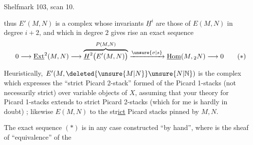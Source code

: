 Shelfmark 103, scan 10.


thus $E'(M,N)$ is a complex whose invariants $\underline{H}^{i}$ are those of $E(M,N)$ in degree $i+2$, and which in degree $2$ gives rise  an exact sequence
\[
0\longrightarrow\underline{\mathrm{Ext}}^{2}(M,N)\longrightarrow
\overbrace{\underline{H}^{2}\bigl(E'(M,N)\bigr)}^{P(M,N)}
\xrightarrow{\unsure{\sigma|s}}\underline{\mathrm{Hom}}(M,{}_{2}N)\longrightarrow 0
\tag*{\makebox[0pt][r]{\makebox[\displaywidth][l]{$(*)$}}}
\]

Heuristically, $E'(M,\deleted{\unsure{M|N}}\unsure{N|\mathbb{N}})$ is the complex which expresses the ``strict Picard 2-stack'' formed of the Picard 1-stacks (not necessarily strict)  over variable objects of $X$, assuming that your theory for  Picard 1-stacks extends to strict Picard 2-stacks (which for me is hardly in doubt) ; likewise $E(M,N)$  to the str\uline{ict} Picard stacks pinned by $M,N$.

The exact sequence $(*)$ is in any case constructed  ``by hand'', where    is the sheaf of    ``equivalence'' of the

